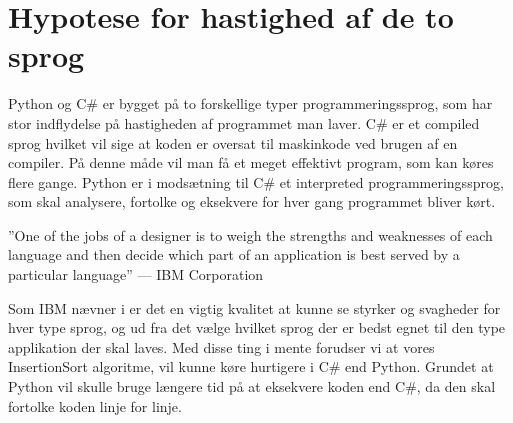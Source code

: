 \documentclass[class=report, crop=false]{standalone}
\begin{document}
    \section{Hypotese for hastighed af de to sprog}
        Python og C\# er bygget på to forskellige typer programmeringssprog, som har stor indflydelse på hastigheden af programmet man laver. C\# er et compiled sprog hvilket vil sige at koden er oversat til maskinkode ved brugen af en compiler. På denne måde vil man få et meget effektivt program, som kan køres flere gange. Python er i modsætning til C\# et interpreted programmeringssprog, som skal analysere, fortolke og eksekvere for hver gang programmet bliver kørt.
        \begin{displayquote}
            ”One of the jobs of a designer is to weigh the strengths and weaknesses of each language and then decide which part of an application is best served by a particular language” --- IBM Corporation\cite{ibmcomvsint}
        \end{displayquote}
        Som IBM nævner i \cite{ibmcomvsint} er det en vigtig kvalitet at kunne se styrker og svagheder for hver type sprog, og ud fra det vælge hvilket sprog der er bedst egnet til den type applikation der skal laves. Med disse ting i mente forudser vi at vores InsertionSort algoritme, vil kunne køre hurtigere i C\# end Python. Grundet at Python vil skulle bruge længere tid på at eksekvere koden end C\#, da den skal fortolke koden linje for linje.
\end{document}
